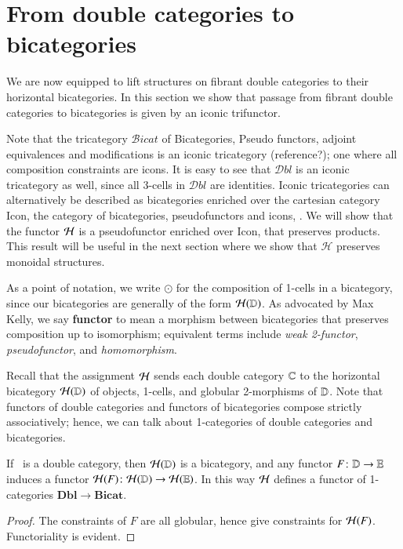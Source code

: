 \documentclass{amsart}
\begin{document}
\section{From double categories to bicategories}
\label{sec:1x1-to-bicat}

We are now equipped to lift structures on fibrant double categories to
their horizontal bicategories.  In this section we show that passage
from fibrant double categories to bicategories is given by an iconic trifunctor.

Note that the tricategory $\mathcal{B}icat$ of Bicategories, Pseudo functors, adjoint equivalences and modifications is an iconic tricategory (reference?); one where all composition constraints are icons. It is easy to see that $\mathcal{D}bl$ is an iconic tricategory as well, since all 3-cells in $\mathcal{D}bl$ are identities.
Iconic tricategories can alternatively be described as bicategories enriched over the cartesian category Icon, the category of bicategories, pseudofunctors and icons, \cite{shulman:psalg}.
We will show that the functor $\mathcal{H}$ is a pseudofunctor enriched over Icon, that preserves products. This result will be useful in the next section where we show that $\mathcal{H}$ preserves monoidal structures.

As a point of notation, we write $\odot$ for the composition of
1-cells in a bicategory, since our bicategories are generally of the
form $\mathcal{H}(\mathbb{D})$.  As advocated by Max Kelly, we say \textbf{functor}
to mean a morphism between bicategories that preserves composition up
to isomorphism; equivalent terms include \emph{weak 2-functor},
\emph{pseudofunctor}, and \emph{homomorphism}.


Recall that the assignment $\mathcal{H}$ sends each double category $\mathbb{C}$ to the horizontal bicategory  $\mathcal{H}(\mathbb{D})$ of objects, 1-cells, and globular 2-morphisms of $\mathbb{D}$.  Note that functors of double categories and functors of bicategories compose strictly associatively; hence, we can talk about 1-categories of double categories and bicategories.  

\begin{thm}\label{thm:1-func}
 If \lD\ is a double category, then $\mathcal{H}(\mathbb{D})$ is a bicategory, and
  any functor $F\colon \mathbb{D}\to\mathbb{E}$ induces a functor $\mathcal{H}(F)\colon
  \mathcal{H}(\mathbb{D})\to\mathcal{H}(\mathbb{E})$.  In this way $\mathcal{H}$ defines a functor of
  1-categories $\mathbf{Dbl}\to \mathbf{Bicat}$.
\end{thm}
\begin{proof}
 The constraints of $F$ are all globular, hence give constraints for
  $\mathcal{H}(F)$.  Functoriality is evident.
\end{proof}
\end{document}
